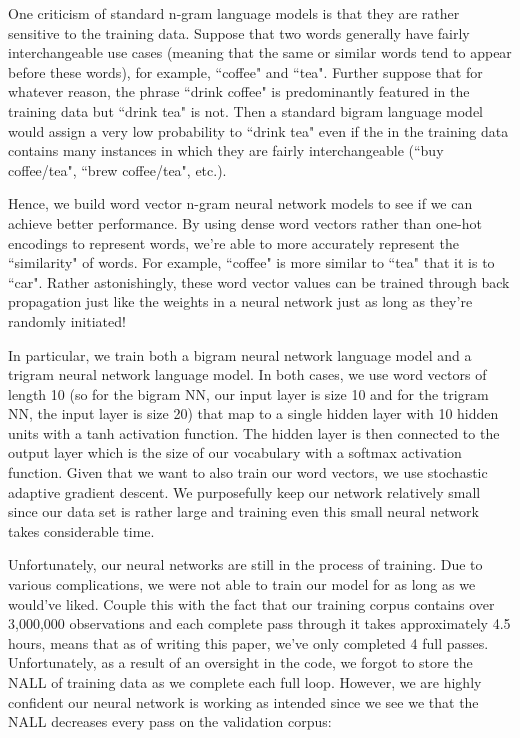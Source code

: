 \documentclass[fleqn,12pt]{SelfArx} %
\begin{document}
One criticism of standard n-gram language models is that they are rather sensitive to the training data. Suppose that two words generally have fairly interchangeable use cases (meaning that the same or similar words tend to appear before these words), for example, ``coffee" and ``tea". Further suppose that for whatever reason, the phrase ``drink coffee" is predominantly featured in the training data but ``drink tea" is not. Then a standard bigram language model would assign a very low probability to ``drink tea" even if the in the training data contains many instances in which they are fairly interchangeable (``buy coffee/tea", ``brew coffee/tea", etc.).

Hence, we build word vector n-gram neural network models to see if we can achieve better performance. By using dense word vectors rather than one-hot encodings to represent words, we're able to more accurately represent the ``similarity" of words. For example, ``coffee" is more similar to ``tea" that it is to ``car". Rather astonishingly, these word vector values can be trained through back propagation just like the weights in a neural network just as long as they're randomly initiated! 

 In particular, we train both a bigram neural network language model and a trigram neural network language model. In both cases, we use word vectors of length 10 (so for the bigram NN, our input layer is size 10 and for the trigram NN, the input layer is size 20) that map to a single hidden layer with 10 hidden units with a tanh activation function. The hidden layer is then connected to the output layer which is the size of our vocabulary with a softmax activation function. Given that we want to also train our word vectors, we use stochastic adaptive gradient descent. We purposefully keep our network relatively small since our data set is rather large and training even this small neural network takes considerable time. 
 
 Unfortunately, our neural networks are still in the process of training. Due to various complications, we were not able to train our model for as long as we would've liked. Couple this with the fact that our training corpus contains over 3,000,000 observations and each complete pass through it takes approximately 4.5 hours, means that as of writing this paper, we've only completed 4 full passes. Unfortunately, as a result of an oversight in the code, we forgot to store the NALL of training data as we complete each full loop. However, we are highly confident our neural network is working as intended since we see we that the NALL decreases every pass on the validation corpus:
 
\end{document}
